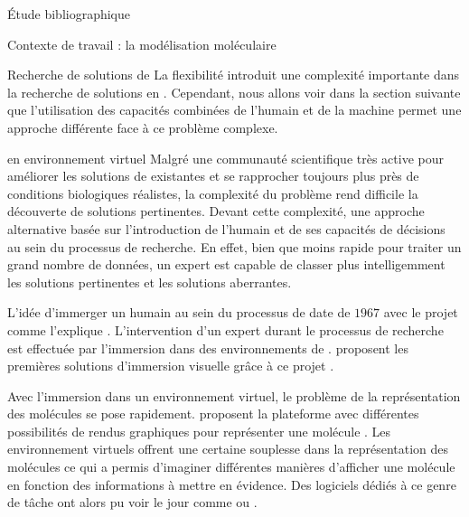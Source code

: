 \documentclass[myfrancais,ngerman,english,frenchb]{mythesis}
\begin{document}
\begin{mychapter}{Étude bibliographique}
\begin{mysection}{Contexte de travail : la modélisation moléculaire}
\begin{mysubsection}{Recherche de solutions de }
				La flexibilité introduit une complexité importante dans la recherche de solutions en .
				Cependant, nous allons voir dans la section suivante que l'utilisation des capacités combinées de l'humain et de la machine permet une approche différente face à ce problème complexe.
			\end{mysubsection}
			\begin{mysubsection}{ en environnement virtuel}
				Malgré une communauté scientifique très active pour améliorer les solutions de  existantes et se rapprocher toujours plus près de conditions biologiques réalistes, la complexité du problème rend difficile la découverte de solutions pertinentes.
				Devant cette complexité, une approche alternative basée sur l'introduction de l'humain et de ses capacités de décisions au sein du processus de recherche.
				En effet, bien que moins rapide pour traiter un grand nombre de données, un expert est capable de classer plus intelligemment les solutions pertinentes et les solutions aberrantes.

				L'idée d'immerger un humain au sein du processus de  date de $1967$ avec le projet \myGROPE comme l'explique .
				L'intervention d'un expert durant le processus de recherche est effectuée par l'immersion dans des environnements de .
				 proposent les premières solutions d'immersion visuelle grâce à ce projet \myGROPE.

				Avec l'immersion dans un environnement virtuel, le problème de la représentation des molécules se pose rapidement.
				 proposent la plateforme \myVIEW avec différentes possibilités de rendus graphiques pour représenter une molécule .
				Les environnement virtuels offrent une certaine souplesse dans la représentation des molécules ce qui a permis d'imaginer différentes manières d'afficher une molécule en fonction des informations à mettre en évidence.
				Des logiciels dédiés à ce genre de tâche ont alors pu voir le jour comme   ou \myPyMOL {}.

				\begin{myfigure}
				\end{myfigure}


\end{mysubsection}
\end{mysection}
\end{mychapter}
\end{document}
